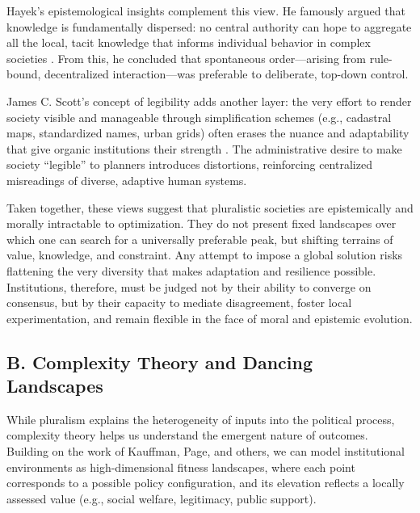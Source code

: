 \documentclass[12pt]{article}  %
\begin{document}
Hayek’s epistemological insights complement this view. He famously argued that knowledge is fundamentally dispersed: no central authority can hope to aggregate all the local, tacit knowledge that informs individual behavior in complex societies \parencite{hayek1945use}. From this, he concluded that spontaneous order—arising from rule-bound, decentralized interaction—was preferable to deliberate, top-down control.

James C. Scott’s concept of legibility adds another layer: the very effort to render society visible and manageable through simplification schemes (e.g., cadastral maps, standardized names, urban grids) often erases the nuance and adaptability that give organic institutions their strength \parencite{scott1998seeing}. The administrative desire to make society “legible” to planners introduces distortions, reinforcing centralized misreadings of diverse, adaptive human systems.

Taken together, these views suggest that pluralistic societies are epistemically and morally intractable to optimization. They do not present fixed landscapes over which one can search for a universally preferable peak, but shifting terrains of value, knowledge, and constraint. Any attempt to impose a global solution risks flattening the very diversity that makes adaptation and resilience possible. Institutions, therefore, must be judged not by their ability to converge on consensus, but by their capacity to mediate disagreement, foster local experimentation, and remain flexible in the face of moral and epistemic evolution.

\subsection*{B. Complexity Theory and Dancing Landscapes}

While pluralism explains the heterogeneity of inputs into the political process, complexity theory helps us understand the emergent nature of outcomes. Building on the work of Kauffman, Page, and others, we can model institutional environments as high-dimensional fitness landscapes, where each point corresponds to a possible policy configuration, and its elevation reflects a locally assessed value (e.g., social welfare, legitimacy, public support).
\end{document}
